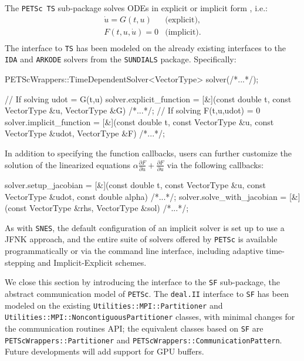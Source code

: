 \documentclass{ansarticle-preprint}
\newcommand{\specialword}[1]{\texttt{#1}}
\newcommand{\dealii}{{\specialword{deal.II}}\xspace}
\newcommand{\petsc}{\specialword{PETSc}\xspace}
\newcommand{\snes}{{\specialword{SNES}}\xspace}
\newcommand{\ts}{{\specialword{TS}}\xspace}
\newcommand{\petscsf}{{\specialword{SF}}\xspace}
\newcommand{\sundials}{{\specialword{SUNDIALS}}\xspace}
\newcommand{\ida}{{\specialword{IDA}}\xspace}
\newcommand{\arkode}{{\specialword{ARKODE}}\xspace}
\begin{document}
The \petsc~\ts sub-package solves ODEs in explicit or implicit form \cite{abhyankar2018petsc}, i.e.:
\begin{eqnarray*}
\dot{u} = G(t,u) &\text{(explicit)},\\
F(t,u,\dot{u}) = 0 &\text{(implicit)}.\\
\end{eqnarray*}
The interface to \ts has been modeled on the already existing interfaces
to the \ida and \arkode solvers from the \sundials package. Specifically:
\begin{c++}
PETScWrappers::TimeDependentSolver<VectorType> solver(/*...*/);

// If solving udot = G(t,u)
solver.explicit_function = [&](const double     t,
                               const VectorType &u,
                               VectorType       &G) {/*...*/};
// If solving F(t,u,udot) = 0
solver.implicit_function = [&](const double     t,
                               const VectorType &u,
                               const VectorType &udot,
                               VectorType       &F) {/*...*/};
\end{c++}
In addition to specifying the function callbacks, users can further customize
the solution of the linearized equations $\alpha \frac{\partial{F}}{\partial{\dot{u}}} + \frac{\partial{F}}{\partial{u}}$
via the following callbacks:
\begin{c++}
solver.setup_jacobian = [&](const double     t,
                            const VectorType &u,
                            const VectorType &udot,
                            const double     alpha) {/*...*/};
solver.solve_with_jacobian = [&](const VectorType &rhs,
                                 VectorType       &sol) {/*...*/};
\end{c++}
As with \snes, the default configuration of an implicit solver is set up to
use a JFNK approach, and the entire suite of solvers offered by \petsc is available
programmatically or via the command line interface,
including adaptive time-stepping and Implicit-Explicit schemes.

We close this section by introducing the interface to the \petscsf sub-package,
the abstract communication model of \petsc. The \dealii interface to
\petscsf has been modeled on the existing \texttt{Utilities::MPI::Partitioner} and
\texttt{Utilities::MPI::NoncontiguousPartitioner} classes, with minimal changes for the
communication routines API; the equivalent classes based
on \petscsf are \texttt{PETScWrappers::Partitioner} and
\texttt{PETScWrappers::CommunicationPattern}.
Future developments will add support for GPU buffers.
\end{document}
